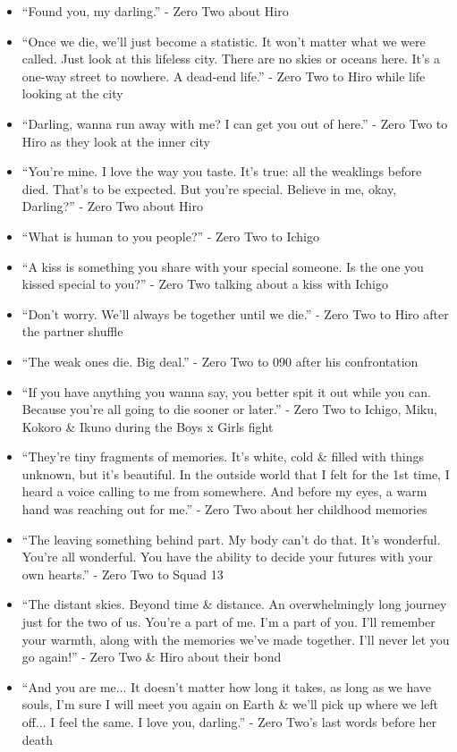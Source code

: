 \documentclass{article}
\begin{document}
\begin{enumerate}
\begin{itemize}
    	\item ``Found you, my darling.'' - Zero Two about Hiro
    	\item ``Once we die, we'll just become a statistic. It won't matter what we were called. Just look at this lifeless city. There are no skies or oceans here. It's a one-way street to nowhere. A dead-end life.'' - Zero Two to Hiro while life looking at the city
    	\item ``Darling, wanna run away with me? I can get you out of here.'' - Zero Two to Hiro as they look at the inner city
    	\item ``You're mine. I love the way you taste. It's true: all the weaklings before died. That's to be expected. But you're special. Believe in me, okay, Darling?'' - Zero Two about Hiro
    	\item ``What is human to you people?'' - Zero Two to Ichigo
    	\item ``A kiss is something you share with your special someone. Is the one you kissed special to you?'' - Zero Two talking about a kiss with Ichigo
    	\item ``Don't worry. We'll always be together until we die.'' - Zero Two to Hiro after the partner shuffle
    	\item ``The weak ones die. Big deal.'' - Zero Two to 090 after his confrontation
    	\item ``If you have anything you wanna say, you better spit it out while you can. Because you're all going to die sooner or later.'' - Zero Two to Ichigo, Miku, Kokoro \& Ikuno during the Boys x Girls fight
    	\item ``They're tiny fragments of memories. It's white, cold \& filled with things unknown, but it's beautiful. In the outside world that I felt for the 1st time, I heard a voice calling to me from somewhere. And before my eyes, a warm hand was reaching out for me.'' - Zero Two about her childhood memories
    	\item ``The leaving something behind part. My body can't do that. It's wonderful. You're all wonderful. You have the ability to decide your futures with your own hearts.'' - Zero Two to Squad 13
    	\item ``The distant skies. Beyond time \& distance. An overwhelmingly long journey just for the two of us. You're a part of me. I'm a part of you. I'll remember your warmth, along with the memories we've made together. I'll never let you go again!'' - Zero Two \& Hiro about their bond
    	\item ``And you are me... It doesn't matter how long it takes, as long as we have souls, I'm sure I will meet you again on Earth \& we'll pick up where we left off... I feel the same. I love you, darling.'' - Zero Two's last words before her death

\end{itemize}
\end{enumerate}
\end{document}
